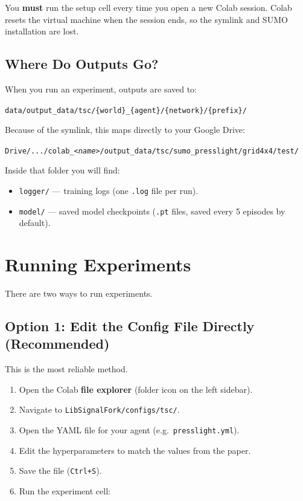 \documentclass[11pt,a4paper]{article}
\begin{document}
\begin{warningbox}
You \textbf{must} run the setup cell every time you open a new Colab session.
Colab resets the virtual machine when the session ends, so the symlink and SUMO installation are lost.
\end{warningbox}

\subsection{Where Do Outputs Go?}

When you run an experiment, outputs are saved to:
\begin{center}
\texttt{data/output\_data/tsc/\{world\}\_\{agent\}/\{network\}/\{prefix\}/}
\end{center}

Because of the symlink, this maps directly to your Google Drive:
\begin{center}
\texttt{Drive/.../colab\_\textit{<name>}/output\_data/tsc/sumo\_presslight/grid4x4/test/}
\end{center}

Inside that folder you will find:
\begin{itemize}
    \item \texttt{logger/} --- training logs (one \texttt{.log} file per run).
    \item \texttt{model/} --- saved model checkpoints (\texttt{.pt} files, saved every 5 episodes by default).
\end{itemize}

\section{Running Experiments}

There are two ways to run experiments.

\subsection{Option 1: Edit the Config File Directly (Recommended)}

This is the most reliable method.

\begin{enumerate}
    \item Open the Colab \textbf{file explorer} (folder icon on the left sidebar).
    \item Navigate to \texttt{LibSignalFork/configs/tsc/}.
    \item Open the YAML file for your agent (e.g.\ \texttt{presslight.yml}).
    \item Edit the hyperparameters to match the values from the paper.
    \item Save the file (\texttt{Ctrl+S}).
    \item Run the experiment cell:
\end{enumerate}
\end{document}
